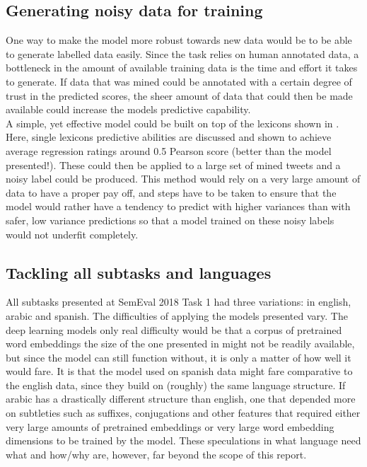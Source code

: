 \subsection{Generating noisy data for training}
One way to make the model more robust towards new data would be to be able to generate labelled data easily. Since the task relies on human annotated data, a bottleneck in the amount of available training data is the time and effort it takes to generate. If data that was mined could be annotated with a certain degree of trust in the predicted scores, the sheer amount of data that could then be made available could increase the models predictive capability.\\
A simple, yet effective model could be built on top of the lexicons shown in \cite{wassa2017}. Here, single lexicons predictive abilities are discussed and shown to achieve average regression ratings around 0.5 Pearson score (better than the model presented!). These could then be applied to a large set of mined tweets and a noisy label could be produced. This method would rely on a very large amount of data to have a proper pay off, and steps have to be taken to ensure that the model would rather have a tendency to predict with higher variances than with safer, low variance predictions so that a model trained on these noisy labels would not underfit completely.

\subsection{Tackling all subtasks and languages}
All subtasks presented at SemEval 2018 Task 1 had three variations: in english, arabic and spanish. The difficulties of applying the models presented vary. The deep learning models only real difficulty would be that a corpus of pretrained word embeddings the size of the one presented in \cite{godin} might not be readily available, but since the model can still function without, it is only a matter of how well it would fare. It is that the model used on spanish data might fare comparative to the english data, since they build on (roughly) the same language structure. If arabic has a drastically different structure than english, one that depended more on subtleties such as suffixes, conjugations and other features that required either very large amounts of pretrained embeddings or very large word embedding dimensions to be trained by the model. These speculations in what language need what and how/why are, however, far beyond the scope of this report.
